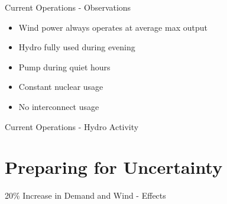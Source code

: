 \documentclass{beamer}
\begin{document}
    
    \begin{frame}{Current Operations - Observations}
    	\begin{itemize}
            \item Wind power always operates at average max output
            \item Hydro fully used during evening
            \item Pump during quiet hours
            \item Constant nuclear usage
            \item No interconnect usage        
    	\end{itemize}
    \end{frame}
    
    
    \begin{frame}{Current Operations - Hydro Activity}
    	    	
    	\begin{figure}[H]
            \centering
        \end{figure}
    
    \end{frame}
    

    
    \section{Preparing for Uncertainty}
    
    
    \begin{frame}{20\% Increase in Demand and Wind - Effects}
    
        \begin{figure}[H]
            \centering
        \end{figure}
        
        
    
    \end{frame}
    
\end{document}
